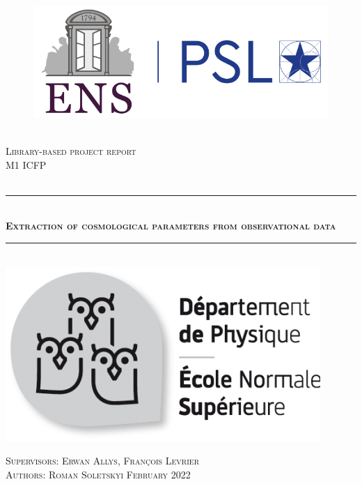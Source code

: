 \documentclass[12pt]{extarticle}
\numberwithin{problem}{section}
\numberwithin{theorem}{section}
\newcommand{\HRule}{\rule{\linewidth}{0.5mm}}
\begin{document}
	
	\begin{titlepage}
		
		\begin{sffamily}
			\centering
			\begin{figure}
				\centering
				\includegraphics[scale=0.38]{FIG0(1)(1).png}~\\[3cm]
				\label{ENS}
			\end{figure}
			\centering
			\textsc{\LARGE Library-based project report}\\[0.5cm]
			\textsc{\LARGE M1 ICFP}\\[0.5cm]
			
			\textsc{\LARGE }\\[0.5cm]
			
			\begin{center}
				
				\HRule \\[0.4cm]
				\textsc{ \huge \bfseries Extraction of cosmological parameters from observational data}
				\HRule \\[1.0cm]
				\href{http://www.phys.ens.fr/}{\includegraphics[scale=0.40]{FIG(1)(1).png}}\vspace*{0.5cm} \hspace*{1.5cm}
			\end{center}
			
			\begin{center}
				\textsc{Supervisors: Erwan Allys, François Levrier}\\
				\textsc{Authors: Roman Soletskyi}
				\vfill
				{\textsc{ \large February 2022}}
				
			\end{center}
		\end{sffamily}
	\end{titlepage}
	
\end{document}
